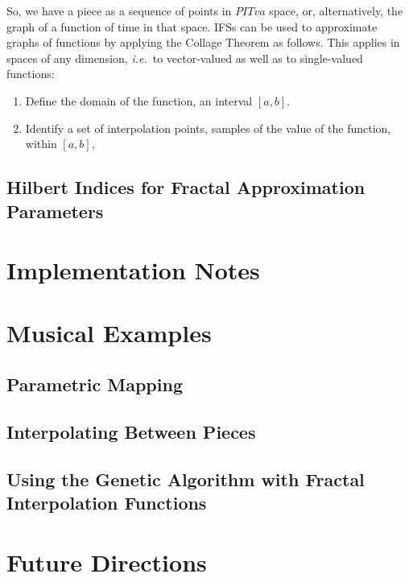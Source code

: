 \documentclass[english,11pt,letterpaper,onecolumn]{scrartcl}
\numberwithin{equation}{section}
\begin{document}
    So, we have a piece as a sequence of points in $PITva$ space, or, 
    alternatively, the graph of a function of time in that space. IFSs can 
    be used to approximate graphs of functions by applying the Collage Theorem 
    as follows. This applies in spaces of any dimension, \textit{i.e.}\ to 
    vector-valued as 
    well as to single-valued functions:
    
    \begin{enumerate}
        \item Define the domain of the function, an interval $[a, b]$.
        \item Identify a set of interpolation points, samples of the value of 
the 
        function, within $[a, b]$, 
    \end{enumerate}
    
    
    
    
    
    
    
    
    
    
    \subsection{Hilbert Indices for Fractal Approximation Parameters}
    
    \section{Implementation Notes}
    
    \section{Musical Examples}
    
    \subsection{Parametric Mapping}
    
    
    \subsection{Interpolating Between Pieces}
    
    
    \subsection{Using the Genetic Algorithm with Fractal Interpolation 
Functions}
    
    \section{Future Directions}
    
\end{document}
